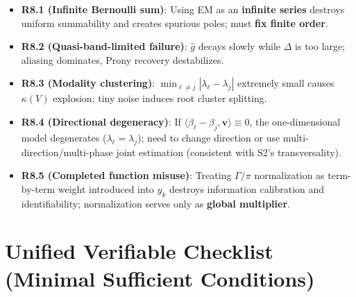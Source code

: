 \documentclass[11pt,a4paper]{article}
\theoremstyle{remark}
\begin{document}
\begin{itemize}
\item \textbf{R8.1 (Infinite Bernoulli sum)}: Using EM as an \textbf{infinite series} destroys uniform summability and creates spurious poles; must \textbf{fix finite order}.

\item \textbf{R8.2 (Quasi-band-limited failure)}: $\widehat{g}$ decays slowly while $\Delta$ is too large; aliasing dominates, Prony recovery destabilizes.

\item \textbf{R8.3 (Modality clustering)}: $\min_{\ell\ne j}|\lambda_\ell-\lambda_j|$ extremely small causes $\kappa(V)$ explosion; tiny noise induces root cluster splitting.

\item \textbf{R8.4 (Directional degeneracy)}: If $\langle\beta_\ell-\beta_j,\mathbf{v}\rangle\equiv 0$, the one-dimensional model degenerates ($\lambda_\ell=\lambda_j$); need to change direction or use multi-direction/multi-phase joint estimation (consistent with S2's transversality).

\item \textbf{R8.5 (Completed function misuse)}: Treating $\Gamma/\pi$ normalization as term-by-term weight introduced into $y_k$ destroys information calibration and identifiability; normalization serves only as \textbf{global multiplier}.
\end{itemize}

\section{Unified Verifiable Checklist (Minimal Sufficient Conditions)}
\end{document}
